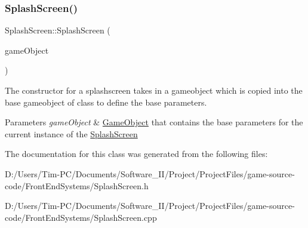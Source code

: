 \subsubsection{\texorpdfstring{Splash\+Screen()}{SplashScreen()}}
{\footnotesize\ttfamily Splash\+Screen\+::\+Splash\+Screen (\begin{DoxyParamCaption}\item[{const \hyperlink{class_game_object}{Game\+Object} \&}]{game\+Object }\end{DoxyParamCaption})}



The constructor for a splashscreen takes in a gameobject which is copied into the base gameobject of class to define the base parameters. 


\begin{DoxyParams}{Parameters}
{\em game\+Object} & \hyperlink{class_game_object}{Game\+Object} that contains the base parameters for the current instance of the \hyperlink{class_splash_screen}{Splash\+Screen} \\
\hline
\end{DoxyParams}


The documentation for this class was generated from the following files\+:\begin{DoxyCompactItemize}
\item 
D\+:/\+Users/\+Tim-\/\+P\+C/\+Documents/\+Software\+\_\+\+I\+I/\+Project/\+Project\+Files/game-\/source-\/code/\+Front\+End\+Systems/Splash\+Screen.\+h\item 
D\+:/\+Users/\+Tim-\/\+P\+C/\+Documents/\+Software\+\_\+\+I\+I/\+Project/\+Project\+Files/game-\/source-\/code/\+Front\+End\+Systems/Splash\+Screen.\+cpp\end{DoxyCompactItemize}

